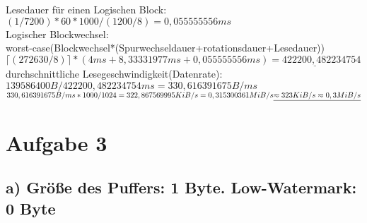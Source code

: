 \documentclass{ti2}
\begin{document}
Lesedauer für einen Logischen Block:\\
$(1/7200)*60*1000/(1200/8) = 0,055555556ms$\\

Logischer Blockwechsel:\\ worst-case(Blockwechsel*(Spurwechseldauer+rotationsdauer+Lesedauer))\\
$\lceil(272630/8)\rceil*(4ms+8,33331977ms+0,055555556ms)\underline{=422200,482234754}$\\






durchschnittliche Lesegeschwindigkeit(Datenrate):\\
$139586400 B / 422200,482234754ms = 330,616391675 B/ms$\\
$330,616391675 B/ms * 1000 / 1024 =\\ 322,867569995 KiB/s = 0,315300361 MiB/s\\ \underline{ \approx 323 KiB/s \approx 0,3 MiB/s }$\\

\section*{Aufgabe 3}

\subsection*{a)  Größe des Puffers: 1 Byte. Low-Watermark: 0 Byte}
\end{document}
